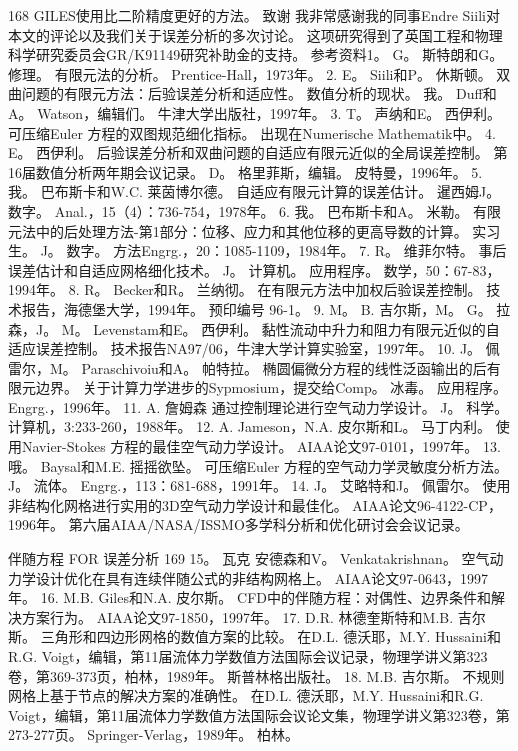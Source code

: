 \documentclass[UTF8,11pt,a4paper,openany,fontset=fandol]{ctexbook}
\begin{document}
168 GILES使用比二阶精度更好的方法。 致谢 我非常感谢我的同事Endre Siili对本文的评论以及我们关于误差分析的多次讨论。 这项研究得到了英国工程和物理科学研究委员会GR/K91149研究补助金的支持。 参考资料1。 G。 斯特朗和G。 修理。 有限元法的分析。 Prentice-Hall，1973年。 2. E。 Siili和P。 休斯顿。 双曲问题的有限元方法：后验误差分析和适应性。 数值分析的现状。 我。 Duff和A。 Watson，编辑们。 牛津大学出版社，1997年。 3. T。 声纳和E。 西伊利。 可压缩Euler 方程的双图规范细化指标。 出现在Numerische Mathematik中。 4. E。 西伊利。 后验误差分析和双曲问题的自适应有限元近似的全局误差控制。 第16届数值分析两年期会议记录。 D。 格里菲斯，编辑。 皮特曼，1996年。 5. 我。 巴布斯卡和W.C. 莱茵博尔德。 自适应有限元计算的误差估计。 暹西姆J。 数字。 Anal.，15（4）：736-754，1978年。 6. 我。 巴布斯卡和A。 米勒。 有限元法中的后处理方法-第1部分：位移、应力和其他位移的更高导数的计算。 实习生。 J。 数字。 方法Engrg.，20：1085-1109，1984年。 7. R。 维菲尔特。 事后误差估计和自适应网格细化技术。 J。 计算机。 应用程序。 数学，50：67-83，1994年。 8. R。 Becker和R。 兰纳彻。 在有限元方法中加权后验误差控制。 技术报告，海德堡大学，1994年。 预印编号 96-1。 9. M。 B. 吉尔斯，M。 G。 拉森，J。 M。 Levenstam和E。 西伊利。 黏性流动中升力和阻力有限元近似的自适应误差控制。 技术报告NA97/06，牛津大学计算实验室，1997年。 10. J。 佩雷尔，M。 Paraschivoiu和A。 帕特拉。 椭圆偏微分方程的线性泛函输出的后有限元边界。 关于计算力学进步的Sypmosium，提交给Comp。 冰毒。 应用程序。 Engrg.，1996年。 11. A. 詹姆森 通过控制理论进行空气动力学设计。 J。 科学。 计算机，3:233-260，1988年。 12. A. Jameson，N.A. 皮尔斯和L。 马丁内利。 使用Navier-Stokes 方程的最佳空气动力学设计。 AIAA论文97-0101，1997年。 13. 哦。 Baysal和M.E. 摇摇欲坠。 可压缩Euler 方程的空气动力学灵敏度分析方法。 J。 流体。 Engrg.，113：681-688，1991年。 14. J。 艾略特和J。 佩雷尔。 使用非结构化网格进行实用的3D空气动力学设计和最佳化。 AIAA论文96-4122-CP，1996年。 第六届AIAA/NASA/ISSMO多学科分析和优化研讨会会议记录。

伴随方程 FOR 误差分析 169 15。 瓦克 安德森和V。 Venkatakrishnan。 空气动力学设计优化在具有连续伴随公式的非结构网格上。 AIAA论文97-0643，1997年。 16. M.B. Giles和N.A. 皮尔斯。 CFD中的伴随方程：对偶性、边界条件和解决方案行为。 AIAA论文97-1850，1997年。 17. D.R. 林德奎斯特和M.B. 吉尔斯。 三角形和四边形网格的数值方案的比较。 在D.L. 德沃耶，M.Y. Hussaini和R.G. Voigt，编辑，第11届流体力学数值方法国际会议记录，物理学讲义第323卷，第369-373页，柏林，1989年。 斯普林格出版社。 18. M.B. 吉尔斯。 不规则网格上基于节点的解决方案的准确性。 在D.L. 德沃耶，M.Y. Hussaini和R.G. Voigt，编辑，第11届流体力学数值方法国际会议论文集，物理学讲义第323卷，第273-277页。 Springer-Verlag，1989年。 柏林。
\end{document}
